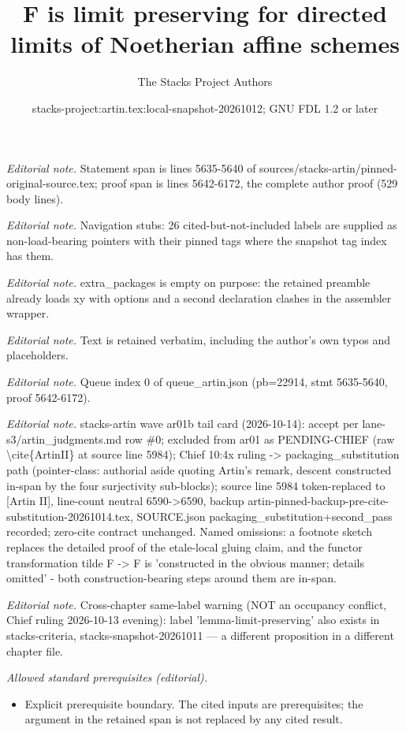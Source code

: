 \documentclass[10pt,a4paper]{amsart}
\title{F is limit preserving for directed limits of Noetherian affine schemes}
\author{The Stacks Project Authors}
\date{stacks-project:artin.tex:local-snapshot-20261012; GNU FDL 1.2 or later}
\theoremstyle{plain}
\theoremstyle{definition}
\theoremstyle{remark}
\numberwithin{equation}{subsection}
\begin{document}
\maketitle
\noindent\textit{Editorial note.} Statement span is lines 5635-5640 of sources/stacks-artin/pinned-original-source.tex; proof span is lines 5642-6172, the complete author proof (529 body lines).\par\medskip
\noindent\textit{Editorial note.} Navigation stubs: 26 cited-but-not-included labels are supplied as non-load-bearing pointers with their pinned tags where the snapshot tag index has them.\par\medskip
\noindent\textit{Editorial note.} extra\_packages is empty on purpose: the retained preamble already loads xy with options and a second declaration clashes in the assembler wrapper.\par\medskip
\noindent\textit{Editorial note.} Text is retained verbatim, including the author's own typos and placeholders.\par\medskip
\noindent\textit{Editorial note.} Queue index 0 of queue\_artin.json (pb=22914, stmt 5635-5640, proof 5642-6172).\par\medskip
\noindent\textit{Editorial note.} stacks-artin wave ar01b tail card (2026-10-14): accept per lane-s3/artin\_judgments.md row \#0; excluded from ar01 as PENDING-CHIEF (raw \textbackslash{}cite\{ArtinII\} at source line 5984); Chief 10:4x ruling -> packaging\_substitution path (pointer-class: authorial aside quoting Artin's remark, descent constructed in-span by the four surjectivity sub-blocks); source line 5984 token-replaced to [Artin II], line-count neutral 6590->6590, backup artin-pinned-backup-pre-cite-substitution-20261014.tex, SOURCE.json packaging\_substitution+second\_pass recorded; zero-cite contract unchanged. Named omissions: a footnote sketch replaces the detailed proof of the etale-local gluing claim, and the functor transformation tilde F -> F is 'constructed in the obvious manner; details omitted' - both construction-bearing steps around them are in-span.\par\medskip
\noindent\textit{Editorial note.} Cross-chapter same-label warning (NOT an occupancy conflict, Chief ruling 2026-10-13 evening): label 'lemma-limit-preserving' also exists in stacks-criteria, stacks-snapshot-20261011 — a different proposition in a different chapter file.\par\medskip
\noindent\textit{Allowed standard prerequisites (editorial).}\begin{itemize}
\item Explicit prerequisite boundary. The cited inputs are prerequisites; the argument in the retained span is not replaced by any cited result.
\end{itemize}\medskip
\end{document}
